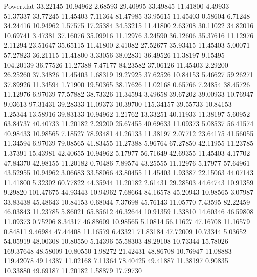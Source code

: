 \begin{filecontents}{Power.dat}
  33.22145   10.94962    2.68593   29.40995
  33.49845   11.41800    4.49933   51.37337
  33.77245   11.45403    7.11364   81.47985
  33.95615   11.45403    0.58604    6.71248
  34.24416   10.94962    1.57575   17.25384
  34.53215   11.41800    2.63708   30.11022
  34.82016   10.69741    3.47381   37.16076
  35.09916   11.12976    3.24590   36.12606
  35.37616   11.12976    2.11294   23.51647
  35.65115   11.41800    2.41082   27.52677
  35.93415   11.45403    5.00071   57.27823
  36.21115   11.41800    3.33056   38.02831
  36.49526   11.38197    9.15495  104.20139
  36.77526   11.27388    7.47177   84.23582
  37.06126   11.45403    2.29200   26.25260
  37.34826   11.45403    1.68319   19.27925
  37.62526   10.84153    5.46627   59.26271
  37.89926   11.34594    1.71900   19.50365
  38.17626   11.02168    0.65766    7.24854
  38.45726   11.12976    6.97039   77.57882
  38.73326   11.34594    3.49658   39.67202
  39.00933   10.76947    9.03613   97.31431
  39.28333   11.09373   10.39700  115.34157
  39.55733   10.84153    1.25344   13.58916
  39.83133   10.94962    1.21762   13.33251
  40.11933   11.38197    5.60952   63.84737
  40.40733   11.20182    2.29200   25.67455
  40.69633   11.09373    5.08537   56.41574
  40.98433   10.98565    7.18527   78.93481
  41.26133   11.38197    2.07712   23.64175
  41.56055   11.34594    6.97039   79.08565
  41.83455   11.27388    5.96764   67.27850
  42.11955   11.23785    1.37391   15.43981
  42.40655   10.94962    5.17977   56.71649
  42.69355   11.45403    4.17702   47.84370
  42.98155   11.20182    0.70486    7.89574
  43.25555   11.12976    5.17977   57.64961
  43.52955   10.94962    3.06683   33.58066
  43.80455   11.45403    1.93387   22.15063
  44.07143   11.41800    5.32302   60.77822
  44.35944   11.20182    2.61431   29.28503
  44.64743   10.91359    9.29820  101.47675
  44.93443   10.94962    7.68664   84.16578
  45.20943   10.98565    3.07987   33.83438
  45.48643   10.84153    0.68044    7.37698
  45.76143   11.05770    7.43595   82.22459
  46.03843   11.23785    5.86021   65.85612
  46.32644   10.91359    1.33810   14.60346
  46.59808   11.09373    0.75206    8.34317
  46.88609   10.98565    5.10814   56.11627
  47.16708   11.16579    0.84811    9.46984
  47.44408   11.16579    6.43321   71.83184
  47.72009   10.73344    5.03652   54.05919
  48.00308   10.80550    5.14396   55.58303
  48.29108   10.73344   15.78026  169.37648
  48.58009   10.80550    1.98272   21.42431
  48.86708   10.76947   11.08883  119.42078
  49.14387   11.02168    7.11364   78.40425
  49.41887   11.38197    0.90835   10.33880
  49.69187   11.20182    1.58879   17.79730

\end{filecontents}
